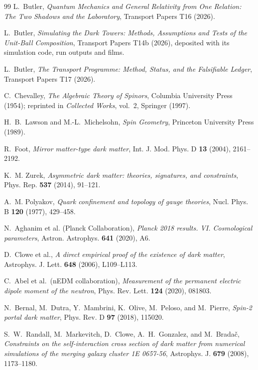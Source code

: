 \documentclass[11pt]{article}
\theoremstyle{definition}
\begin{document}
\begin{thebibliography}{99}
L.~Butler,
\emph{Quantum Mechanics and General Relativity from One Relation: The Two Shadows and the Laboratory},
Transport Papers T16 (2026).

L.~Butler,
\emph{Simulating the Dark Towers: Methods, Assumptions and Tests of the Unit-Ball Composition},
Transport Papers T14b (2026), deposited with its simulation code, run outputs and films.

L.~Butler,
\emph{The Transport Programme: Method, Status, and the Falsifiable Ledger},
Transport Papers T17 (2026).

C.~Chevalley,
\emph{The Algebraic Theory of Spinors},
Columbia University Press (1954); reprinted in \emph{Collected Works}, vol.~2, Springer (1997).

H.~B.~Lawson and M.-L.~Michelsohn,
\emph{Spin Geometry},
Princeton University Press (1989).

R.~Foot,
\emph{Mirror matter-type dark matter},
Int. J. Mod. Phys. D \textbf{13} (2004), 2161--2192.

K.~M. Zurek,
\emph{Asymmetric dark matter: theories, signatures, and constraints},
Phys. Rep. \textbf{537} (2014), 91--121.

A.~M. Polyakov,
\emph{Quark confinement and topology of gauge theories},
Nucl. Phys. B \textbf{120} (1977), 429--458.

N.~Aghanim et al. (Planck Collaboration),
\emph{Planck 2018 results. VI. Cosmological parameters},
Astron. Astrophys. \textbf{641} (2020), A6. %

D.~Clowe et al.,
\emph{A direct empirical proof of the existence of dark matter},
Astrophys. J. Lett. \textbf{648} (2006), L109--L113.

C.~Abel et al.\ (nEDM collaboration),
\emph{Measurement of the permanent electric dipole moment of the neutron},
Phys. Rev. Lett. \textbf{124} (2020), 081803.

N.~Bernal, M.~Dutra, Y.~Mambrini, K.~Olive, M.~Peloso, and M.~Pierre,
\emph{Spin-2 portal dark matter},
Phys. Rev. D \textbf{97} (2018), 115020.

S.~W.~Randall, M.~Markevitch, D.~Clowe, A.~H.~Gonzalez, and M.~Brada\v{c},
\emph{Constraints on the self-interaction cross section of dark matter from numerical simulations of the merging galaxy cluster 1E 0657-56},
Astrophys. J. \textbf{679} (2008), 1173--1180.


\end{thebibliography}
\end{document}
